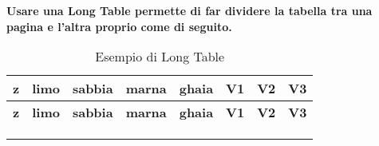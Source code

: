 \textbf{Usare una Long Table permette di far dividere la tabella tra una pagina e l'altra proprio come di seguito.
}
\begin{longtable}{c|cccc|ccc}
\centering

\textbf{z} & \textbf{limo} & \textbf{sabbia} & \textbf{marna} & \textbf{ghaia} & \textbf{V1} & \textbf{V2} & \textbf{V3} \\
\hline
\endfirsthead

\textbf{z} & \textbf{limo} & \textbf{sabbia} & \textbf{marna} & \textbf{ghaia} & \textbf{V1} & \textbf{V2} & \textbf{V3} \\
\hline
\endhead   

\hline
\multicolumn{8}{c}{} \\ %
\caption{Esempio di Long Table}\\
\endlastfoot %


\end{longtable}
